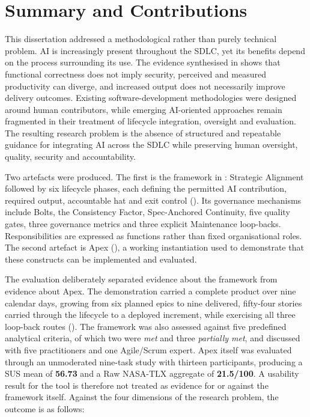 
\label{chap:conclusion}

\section{Summary and Contributions}
\label{sec:conclusion_summary}

This dissertation addressed a methodological rather than purely technical problem. \ac{AI} is increasingly present throughout the \ac{SDLC}, yet its benefits depend on the process surrounding its use. The evidence synthesised in  shows that functional correctness does not imply security, perceived and measured productivity can diverge, and increased output does not necessarily improve delivery outcomes. Existing software-development methodologies were designed around human contributors, while emerging AI-oriented approaches remain fragmented in their treatment of lifecycle integration, oversight and evaluation. The resulting research problem is the absence of structured and repeatable guidance for integrating \ac{AI} across the \ac{SDLC} while preserving human oversight, quality, security and accountability.

Two artefacts were produced. The first is the framework in : Strategic Alignment followed by six lifecycle phases, each defining the permitted AI contribution, required output, accountable hat and exit control (). Its governance mechanisms include Bolts, the Consistency Factor, Spec-Anchored Continuity, five quality gates, three governance metrics and three explicit Maintenance loop-backs. Responsibilities are expressed as functions rather than fixed organisational roles. The second artefact is Apex (), a working instantiation used to demonstrate that these constructs can be implemented and evaluated.

The evaluation deliberately separated evidence about the framework from evidence about Apex. The demonstration carried a complete product over nine calendar days, growing from six planned epics to nine delivered, fifty-four stories carried through the lifecycle to a deployed increment, while exercising all three loop-back routes (). The framework was also assessed against five predefined analytical criteria, of which two were \emph{met} and three \emph{partially met}, and discussed with five practitioners and one Agile/Scrum expert. Apex itself was evaluated through an unmoderated nine-task study with thirteen participants, producing a \ac{SUS} mean of \textbf{56.73} and a Raw \ac{NASA-TLX} aggregate of \textbf{21.5/100}. A usability result for the tool is therefore not treated as evidence for or against the framework itself. Against the four dimensions of the research problem, the outcome is as follows:

